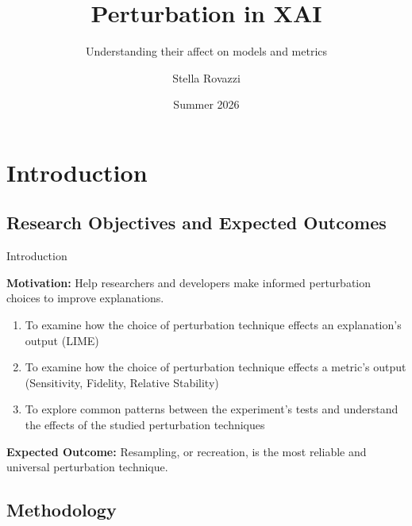 \documentclass{beamer}
\author{Stella Rovazzi}
\title{Perturbation in XAI}
\subtitle{Understanding their affect on models and metrics}
\institute{University of Guelph}
\date{Summer 2026}
\begin{document}
\begin{frame}
    \titlepage
\end{frame}

{\AtBeginSection{}
\section{Introduction}}
\subsection{Research Objectives and Expected Outcomes}

\begin{frame}{Introduction} %

    \textbf{Motivation:} Help researchers and developers make informed perturbation choices to improve explanations. \\
        \vspace{0.5cm}      
   
    \begin{enumerate}
        \item To examine how the choice of perturbation technique effects an explanation's output (LIME)
        \item To examine how the choice of perturbation technique effects a metric's output (Sensitivity, Fidelity, Relative Stability)
        \item To explore common patterns between the experiment's tests and understand the effects of the studied perturbation techniques
    \end{enumerate}
        \vspace{0.5cm}      
	\textbf{Expected Outcome:} Resampling, or recreation, is the most reliable and universal perturbation technique.

\end{frame}


{
\subsection{Methodology}} %

\begin{frame} %
\tableofcontents[sectionstyle=show,subsectionstyle=show/shaded/hide,subsubsectionstyle=show/shaded/hide]
\end{frame}
\end{document}
